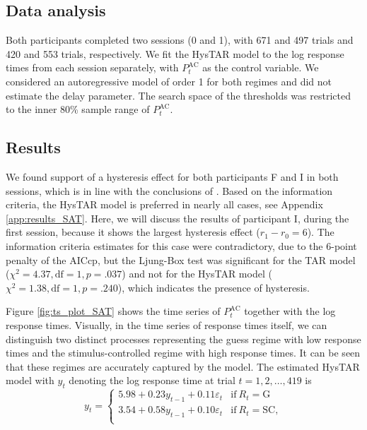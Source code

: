 \documentclass{article}
\begin{document}
\subsection{Data analysis}
Both participants completed two sessions (0 and 1), with 671 and 497 trials and 420 and 553 trials, respectively.
We fit the HysTAR model to the log response times from each session separately, with $P^{\mathrm{AC}}_t$ as the control variable. 
We considered an autoregressive model of order 1 for both regimes and did not estimate the delay parameter.
The search space of the thresholds was restricted to the inner 80\% sample range of $P^{\mathrm{AC}}_t$.

\subsection{Results}
We found support of a hysteresis effect for both participants F and I in both sessions, which is in line with the conclusions of \citet{speedaccuracy}.
Based on the information criteria, the HysTAR model is preferred in nearly all cases, see Appendix \ref{app:results_SAT}.
Here, we will discuss the results of participant I, during the first session, because it shows the largest hysteresis effect ($r_1 - r_0 = 6$). 
The information criteria estimates for this case were contradictory, due to the 6-point penalty of the AICcp, 
but the Ljung-Box test was significant for the TAR model ($\chi^2 = 4.37, \text{df} = 1, p = .037$) and not for the HysTAR model ($\chi^2 = 1.38, \text{df} = 1, p = .240$), which indicates the presence of hysteresis.

Figure \ref{fig:ts_plot_SAT} shows the time series of $P^{\mathrm{AC}}_t$ together with the log response times.
Visually, in the time series of response times itself, we can distinguish two distinct processes representing the guess regime with low response times and the stimulus-controlled regime with high response times.
It can be seen that these regimes are accurately captured by the model.
The estimated HysTAR model with $y_t$ denoting the log response time at trial $t = 1, 2, \dots, 419$ is
\begin{equation}
y_t = 
\begin{cases}
5.98 + 0.23 y_{t-1} + 0.11 \varepsilon_t & \text{if}~R_{t} = \mathrm{G}\\
3.54 + 0.58 y_{t-1} + 0.10 \varepsilon_t & \text{if}~R_{t} = \mathrm{SC}, \\
\end{cases}
\end{equation}
\end{document}
